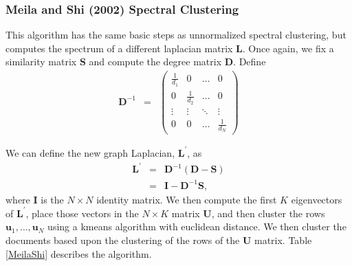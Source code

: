 \documentclass[11pt,letterpaper]{article}
\numberwithin{equation}{section}
\begin{document}
\subsubsection{Meila and Shi (2002) Spectral Clustering }
This algorithm has the same basic steps as unnormalized spectral
clustering, but computes the spectrum of a different laplacian
matrix $\boldsymbol{L}$.  Once again, we fix a similarity matrix
$\boldsymbol{S}$ and compute the degree matrix $\boldsymbol{D}$.
 Define
\begin{eqnarray}
\boldsymbol{D}^{-1} & = & \begin{pmatrix}\frac{1}{d_1} & 0 & \hdots
& 0 \\
0 & \frac{1}{d_2}& \hdots & 0 \\
\vdots & \vdots & \ddots & \vdots \\
0 & 0 & \hdots & \frac{1}{d_N}
\end{pmatrix} \nonumber
\end{eqnarray}

We can define the new graph Laplacian, $\boldsymbol{L}^{'}$, as
\begin{eqnarray}
\boldsymbol{L}^{'} & = & \boldsymbol{D}^{-1} (\boldsymbol{D} -
\boldsymbol{S}) \nonumber \\
& = & \boldsymbol{I} - \boldsymbol{D}^{-1}\boldsymbol{S}, \nonumber
\end{eqnarray}
where $\boldsymbol{I}$ is the $N \times N$ identity matrix.  We then
compute the first $K$ eigenvectors of $\boldsymbol{L}^{'}$, place
those vectors in the $N \times K$ matrix $\boldsymbol{U}$, and then
cluster the rows $\boldsymbol{u}_1, \hdots, \boldsymbol{u}_N$ using
a kmeans algorithm with euclidean distance.  We then cluster the
documents based upon the clustering of the rows of the
$\boldsymbol{U}$ matrix.  Table \ref{MeilaShi} describes the
algorithm.

\begin{table}[hbt!] \caption{Meila and Shi (2001) Spectral
Clustering} \label{MeilaShi} 
\end{table}
\end{document}
